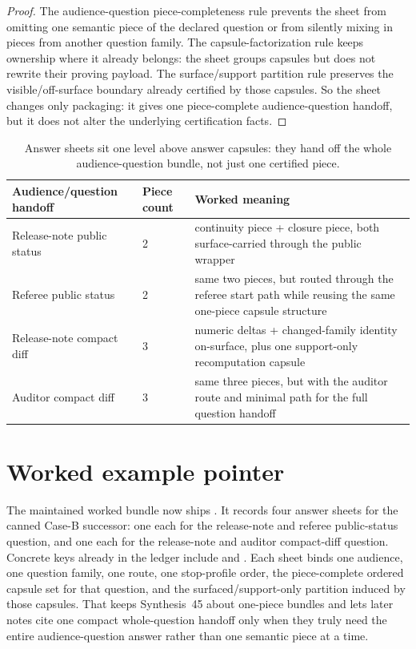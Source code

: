 \documentclass[11pt]{article}
\begin{document}
\begin{proof}
The audience-question piece-completeness rule prevents the sheet from omitting one semantic piece of the declared question or from silently mixing in pieces from another question family.
The capsule-factorization rule keeps ownership where it already belongs: the sheet groups capsules but does not rewrite their proving payload.
The surface/support partition rule preserves the visible/off-surface boundary already certified by those capsules.
So the sheet changes only packaging: it gives one piece-complete audience-question handoff, but it does not alter the underlying certification facts.\qedhere
\end{proof}

\begin{table}[t]
\centering
\small
\begin{tabularx}{\linewidth}{@{}L M Y@{}}
\toprule
Audience/question handoff & Piece count & Worked meaning \\
\midrule
Release-note public status & 2 & continuity piece + closure piece, both surface-carried through the public wrapper \\
Referee public status & 2 & same two pieces, but routed through the referee start path while reusing the same one-piece capsule structure \\
Release-note compact diff & 3 & numeric deltas + changed-family identity on-surface, plus one support-only recomputation capsule \\
Auditor compact diff & 3 & same three pieces, but with the auditor route and minimal path for the full question handoff \\
\bottomrule
\end{tabularx}
\caption{Answer sheets sit one level above answer capsules: they hand off the whole audience-question bundle, not just one certified piece.}
\label{tab:answersheets}
\end{table}

\section{Worked example pointer}
The maintained worked bundle now ships .\cite{series:workedexample}
It records four answer sheets for the canned Case-B successor: one each for the release-note and referee public-status question, and one each for the release-note and auditor compact-diff question.
Concrete keys already in the ledger include  and .
Each sheet binds one audience, one question family, one route, one stop-profile order, the piece-complete ordered capsule set for that question, and the surfaced/support-only partition induced by those capsules.
That keeps Synthesis~45 about one-piece bundles and lets later notes cite one compact whole-question handoff only when they truly need the entire audience-question answer rather than one semantic piece at a time.\cite{series:challengeanswercapsules}
\end{document}
